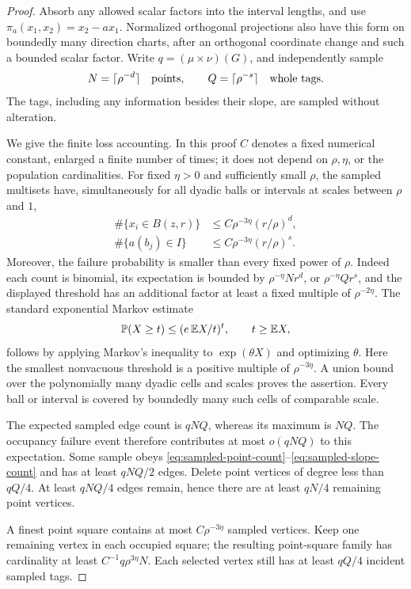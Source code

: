 \begin{proof}
Absorb any allowed scalar factors into the interval lengths, and use
\(\pi_a(x_1,x_2)=x_2-a x_1\). Normalized orthogonal projections
also have this form on boundedly many direction charts, after an
orthogonal coordinate change and such a bounded scalar factor. Write
\(q=(\mu\times\nu)(G)\), and independently sample
\[
 N=\lceil\rho^{-d}\rceil\quad\hbox{points},\qquad
 Q=\lceil\rho^{-s}\rceil\quad\hbox{whole tags}.
\]
The tags, including any information besides their slope, are sampled
without alteration.

We give the finite loss accounting. In this proof \(C\) denotes a
fixed numerical constant, enlarged a finite number of times; it does
not depend on \(\rho,\eta\), or the population cardinalities.
For fixed \(\eta>0\) and sufficiently small \(\rho\), the sampled
multisets have, simultaneously for all dyadic balls or intervals at
scales between \(\rho\) and \(1\),
\begin{align}
 \#\{x_i\in B(z,r)\}
 &\le C\rho^{-3\eta}(r/\rho)^d, \label{eq:sampled-point-count}\\
 \#\{a(b_j)\in I\}
 &\le C\rho^{-3\eta}(r/\rho)^s. \label{eq:sampled-slope-count}
\end{align}
Moreover, the failure probability is smaller than every fixed power
of \(\rho\). Indeed each count is binomial, its expectation is bounded
by \(\rho^{-\eta}N r^d\), or \(\rho^{-\eta}Q r^s\), and the displayed
threshold has an additional factor at least a fixed multiple of
\(\rho^{-2\eta}\). The standard exponential Markov estimate
\[
 \mathbb P(X\ge t)\le (e\,\mathbb E X/t)^t,\qquad t\ge \mathbb E X,
\]
follows by applying Markov's inequality to
\(\exp(\theta X)\) and optimizing \(\theta\).
Here the smallest nonvacuous threshold is a positive multiple of
\(\rho^{-3\eta}\). A union bound over the polynomially many dyadic
cells and scales proves the assertion. Every ball or interval is
covered by boundedly many such cells of comparable scale.

The expected sampled edge count is \(qNQ\), whereas its maximum is
\(NQ\). The occupancy failure event therefore contributes at most
\(o(qNQ)\) to this expectation. Some sample obeys
\eqref{eq:sampled-point-count}--\eqref{eq:sampled-slope-count} and
has at least \(qNQ/2\) edges. Delete point vertices of degree
less than \(qQ/4\). At least \(qNQ/4\) edges remain, hence there
are at least \(qN/4\) remaining point vertices.

A finest point square contains at most \(C\rho^{-3\eta}\)
sampled vertices. Keep one remaining vertex in each occupied square;
the resulting point-square family has cardinality at least
\(C^{-1}q\rho^{3\eta}N\). Each selected vertex still has at least
\(qQ/4\) incident sampled tags.


\end{proof}
